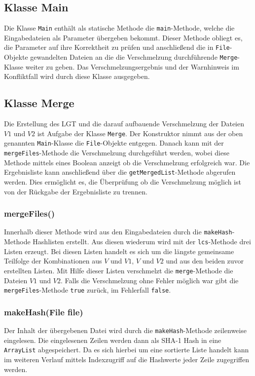 \documentclass[a4paper,titlepage,12pt]{scrartcl}
\begin{document}
\subsection{Klasse Main}
\label{sec:classmain}
Die Klasse \texttt{Main} enthält als statische Methode die \texttt{main}-Methode, welche die Eingabedateien als Parameter übergeben bekommt.
Dieser Methode obliegt es, die Parameter auf ihre Korrektheit zu prüfen und anschließend die in \texttt{File}-Objekte gewandelten Dateien
an die die Verschmelzung durchführende \texttt{Merge}-Klasse weiter zu geben.
Das Verschmelzungsergebnis und der Warnhinweis im Konfliktfall wird durch diese Klasse ausgegeben.

\subsection{Klasse Merge}
\label{sec:classmerge}
Die Erstellung des LGT und die darauf aufbauende Verschmelzung der Dateien $V1$ und $V2$ ist Aufgabe der Klasse \texttt{Merge}. Der Konstruktor nimmt aus der oben genannten \texttt{Main}-Klasse die \texttt{File}-Objekte entgegen. Danach kann mit der \texttt{mergeFiles}-Methode die Verschmelzung durchgeführt werden, wobei diese Methode mittels eines Boolean anzeigt ob die Verschmelzung erfolgreich war. Die Ergebnisliste kann anschließend über die \texttt{getMergedList}-Methode abgerufen werden. Dies ermöglicht es, die Überprüfung ob die Verschmelzung möglich ist von der Rückgabe der Ergebnisliste zu trennen.

\subsubsection{mergeFiles()}
\label{sec:mergefiles}
Innerhalb dieser Methode wird aus den Eingabedateien durch die \texttt{makeHash}-Methode Hashlisten erstellt. Aus diesen wiederum wird mit der \texttt{lcs}-Methode drei Listen erzeugt.
Bei diesen Listen handelt es sich um die längste gemeinsame Teilfolge der Kombinationen aus $V$ und $V1$, $V$ und $V2$ und aus den beiden zuvor erstellten Listen. Mit Hilfe dieser Listen verschmelzt die \texttt{merge}-Methode die Dateien $V1$ und $V2$. Falls die Verschmelzung ohne Fehler möglich war gibt die \texttt{mergeFiles}-Methode \texttt{true} zurück, im Fehlerfall \texttt{false}.

\subsubsection{makeHash(File file)}
\label{sec:makehash}
Der Inhalt der übergebenen Datei wird durch die \texttt{makeHash}-Methode zeilenweise eingelesen.
Die eingelesenen Zeilen werden dann als SHA-1 Hash in eine \texttt{ArrayList} abgespeichert. Da es sich hierbei um eine sortierte Liste handelt kann im weiteren Verlauf mittels Indexzugriff auf die Hashwerte jeder Zeile zugegriffen werden.
\end{document}
